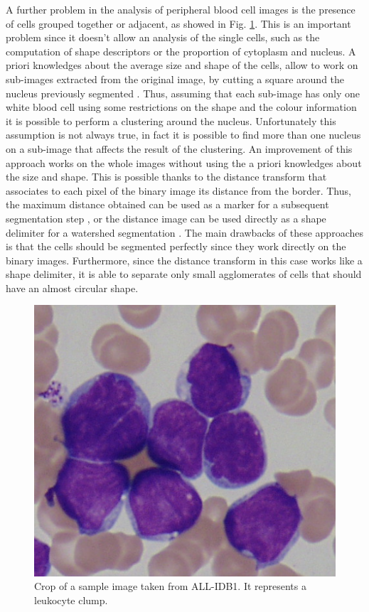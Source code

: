 \documentclass[final,a4paper,12pt,english]{UnicaPhdThesis3}
\begin{document}
A further problem in the analysis of peripheral blood cell images is the presence of cells grouped together or adjacent, as showed in Fig. \ref{fig_clumps}. This is an important problem since it doesn't allow an analysis of the single cells, such as the computation of shape descriptors or the proportion of cytoplasm and nucleus. A priori knowledges about the average size and shape of the cells, allow to work on sub-images extracted from the original image, by cutting a square around the nucleus previously segmented \cite{Kovalev, Sinha}. Thus, assuming that each sub-image has only one white blood cell using some restrictions on the shape and the colour information it is possible to perform a clustering around the nucleus. Unfortunately this assumption is not always true, in fact it is possible to find more than one nucleus on a sub-image that affects the result of the clustering. An improvement of this approach works on the whole images without using the a priori knowledges about the size and shape. This is possible thanks to the distance transform \cite{Maurer} that associates to each pixel of the binary image its distance from the border. Thus, the maximum distance obtained can be used as a marker for a subsequent segmentation step \cite{Malpica}, or the distance image can be used directly as a shape delimiter for a watershed segmentation \cite{Lindblad}. The main drawbacks of these approaches is that the cells should be segmented perfectly since they work directly on the binary images. Furthermore, since the distance transform in this case works like a shape delimiter, it is able to separate only small agglomerates of cells that should have an almost circular shape.

\begin{figure}[h]
	\centering
	\includegraphics[height=0.25\textwidth]{images/2016_1_mva/clump}
	\caption{\label{fig_clumps}Crop of a sample image taken from ALL-IDB1. It represents a leukocyte clump.}
\end{figure}
\end{document}
